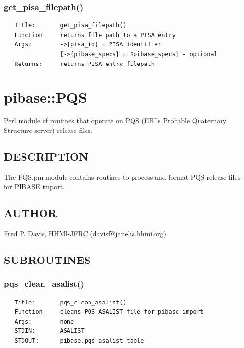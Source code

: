 \documentclass{article}
\begin{document}
\subsubsection*{get\_pisa\_filepath()\label{pibase::PISA_get_pisa_filepath_}}
\begin{verbatim}
   Title:       get_pisa_filepath()
   Function:    returns file path to a PISA entry
   Args:        ->{pisa_id} = PISA identifier
                [->{pibase_specs} = $pibase_specs] - optional
   Returns:     returns PISA entry filepath
\end{verbatim}
\clearpage
\section{pibase::PQS\label{pibase::PQS}}


Perl module of routines that operate on PQS (EBI's Probable
Quaternary Structure server) release files.

\subsection*{DESCRIPTION\label{pibase::PQS_DESCRIPTION}}


The PQS.pm module contains routines to process and format PQS release files for PIBASE import.

\subsection*{AUTHOR\label{pibase::PQS_AUTHOR}}


Fred P. Davis, HHMI-JFRC (davisf@janelia.hhmi.org)

\subsection*{SUBROUTINES\label{pibase::PQS_SUBROUTINES}}
\subsubsection*{pqs\_clean\_asalist()\label{pibase::PQS_pqs_clean_asalist_}}
\begin{verbatim}
   Title:       pqs_clean_asalist()
   Function:    cleans PQS ASALIST file for pibase import
   Args:        none
   STDIN:       ASALIST
   STDOUT:      pibase.pqs_asalist table
\end{verbatim}
\end{document}
